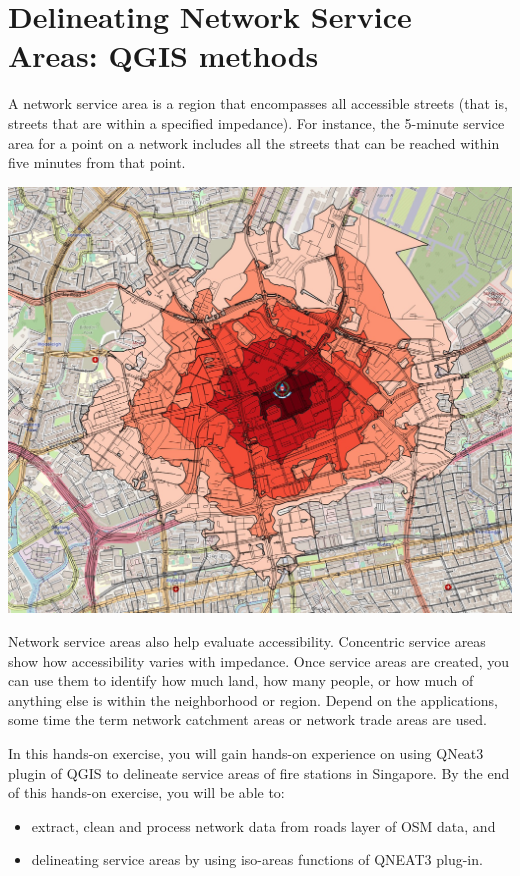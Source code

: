 \documentclass[
  letterpaper,
  DIV=11,
  numbers=noendperiod]{scrreprt}
\providecommand{\tightlist}{%
  \setlength{\itemsep}{0pt}\setlength{\parskip}{0pt}}\usepackage{longtable,booktabs,array}
\begin{document}

\hypertarget{delineating-network-service-areas-qgis-methods}{%
\chapter{Delineating Network Service Areas: QGIS
methods}\label{delineating-network-service-areas-qgis-methods}}

A network service area is a region that encompasses all accessible
streets (that is, streets that are within a specified impedance). For
instance, the 5-minute service area for a point on a network includes
all the streets that can be reached within five minutes from that point.

\includegraphics{./img11/image1.jpg}

Network service areas also help evaluate accessibility. Concentric
service areas show how accessibility varies with impedance. Once service
areas are created, you can use them to identify how much land, how many
people, or how much of anything else is within the neighborhood or
region. Depend on the applications, some time the term network catchment
areas or network trade areas are used.

In this hands-on exercise, you will gain hands-on experience on using
QNeat3 plugin of QGIS to delineate service areas of fire stations in
Singapore. By the end of this hands-on exercise, you will be able to:

\begin{itemize}
\tightlist
\item
  extract, clean and process network data from roads layer of OSM data,
  and
\item
  delineating service areas by using iso-areas functions of QNEAT3
  plug-in.
\end{itemize}
\end{document}
